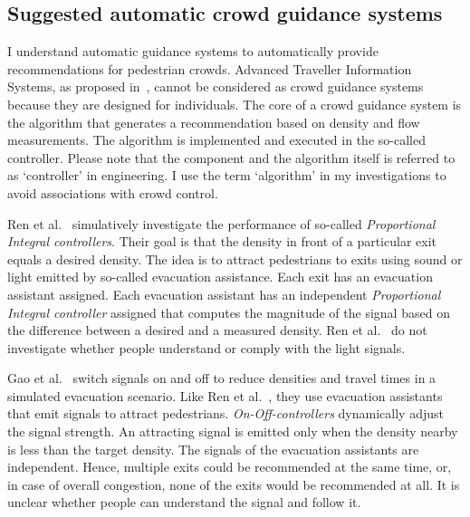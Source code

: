 \subsection{Suggested automatic crowd guidance systems}

\label{sec:modelalg}



I understand automatic guidance systems to automatically provide recommendations for pedestrian crowds. Advanced Traveller Information Systems, as proposed in~\cite{essen-2016-cdyn,sato-2014-cdyn}, cannot be considered as crowd guidance systems because they are designed for individuals.
The core of a crowd guidance system is the algorithm that generates a recommendation based on density and flow measurements. The algorithm is implemented and executed in the so-called controller. Please note that the component and the algorithm itself is referred to as `controller' in engineering. I use the term `algorithm' in my investigations to avoid associations with crowd control.



%
Ren et al.~\cite{ren-2021-cdyn} simulatively investigate the performance of so-called \textit{Proportional Integral controllers}. Their goal is that the density in front of a particular exit equals a desired density. The idea is to attract pedestrians to exits using sound or light emitted by so-called evacuation assistance. Each exit has an evacuation assistant assigned. Each evacuation assistant has an independent \textit{Proportional Integral controller} assigned that computes the magnitude of the signal based on the difference between a desired and a measured density. Ren et al.~\cite{ren-2021-cdyn} do not investigate whether people understand or comply with the light signals. 


Gao et al.~\cite{gao-2022-cdyn} switch signals on and off to reduce densities and travel times in a simulated evacuation scenario. Like Ren et al.~\cite{ren-2021-cdyn}, they use evacuation assistants that emit signals to attract pedestrians. \textit{On-Off-controllers} dynamically adjust the signal strength. An attracting signal is emitted only when the density nearby is less than the target density. The signals of the evacuation assistants are independent. Hence, multiple exits could be recommended at the same time, or, in case of overall congestion, none of the exits would be recommended at all. It is unclear whether people can understand the signal and follow it. 


